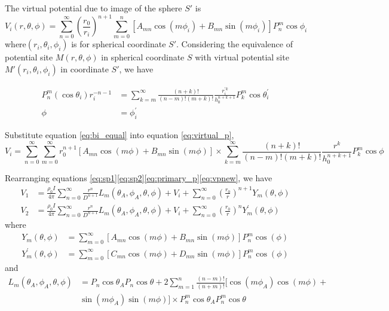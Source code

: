 \documentclass[11pt,letterpaper,leqno]{amsart}
\numberwithin{equation}{section}
\begin{document}
The virtual potential due to image of the sphere $S'$ is
\begin{equation}\label{eq:virtual_p}
V_i(r,\theta,\phi) = \sum\limits_{n=0}^\infty(\frac{r_0}{r_i})^{n+1}\sum\limits_{m=0}^n [A_{mn}\cos(m\phi_i) + B_{mn}\sin(m\phi_i)]P_n^m\cos\phi_i
\end{equation}
where$(r_i,\theta_i,\phi_i)$ is for spherical coordinate $S'$. Considering the equivalence of potential site $M(r,\theta,\phi)$ in spherical coordinate $S$ with virtual potential site $M'(r_i,\theta_i,\phi_i)$ in coordinate $S'$, we have

\begin{subequations}\label{eq:bi_equal}
\begin{align}
P_n^m(\cos\theta_i)r_i^{-n-1} &= \sum\limits_{k=m}^\infty \frac{(n+k)!}{(n-m)!(m+k)!}\frac{r_i^{\prime	k}}{h_0^{n+k+1}}P_k^m\cos\theta_i^\prime \\
\phi &= \phi_i^\prime
\end{align}
\end{subequations}

Substitute equation \eqref{eq:bi_equal} into equation \eqref{eq:virtual_p}, 
\begin{equation}\label{eq:vpnew}
V_i = \sum\limits_{n=0}^\infty\sum\limits_{m=0}^\infty r_0^{n+1}[A_{mn}\cos(m\phi) + B_{mn}\sin(m\phi)] \times \sum\limits_{k=m}^\infty\frac{(n+k)!}{(n-m)!(m+k)!}\frac{r^k}{h_0^{n+k+1}}P_k^m\cos\phi
\end{equation}

Rearranging equations \eqref{eq:sp1}\eqref{eq:sp2}\eqref{eq:primary_p}\eqref{eq:vpnew}, we have
\begin{align}
V_1 &= \frac{\rho_0 I}{4\pi}\sum\limits_{n=0}^\infty\frac{r^n}{D^{n+1}}L_m(\theta_A,\phi_A,\theta,\phi) + V_i + \sum\limits_{n=0}^\infty(\frac{r_0}{r})^{n+1}Y_m(\theta,\phi) \\
V_2 &= \frac{\rho_0 I}{4\pi}\sum\limits_{n=0}^\infty\frac{r^n}{D^{n+1}}L_m(\theta_A,\phi_A,\theta,\phi) + V_i + \sum\limits_{n=0}^\infty(\frac{r_0}{r})^{n}Y^\prime_m(\theta,\phi)
\end{align}
where
\begin{align}
Y_m(\theta,\phi) &= \sum\limits_{m=0}^\infty[A_{mn}\cos(m\phi)+B_{mn}\sin(m\phi)]P_n^m\cos(\phi) \\
Y_m^\prime(\theta,\phi) &= \sum\limits_{m=0}^\infty[C_{mn}\cos(m\phi)+D_{mn}\sin(m\phi)]P_n^m\cos(\phi) 
\end{align}
and
\begin{equation}
\begin{split}
L_m(\theta_A,\phi_A,\theta,\phi) &= P_n\cos\theta_A P_n\cos\theta + 2\sum\limits_{m=1}^n\frac{(n-m)!}{(n+m)!}[\cos(m\phi_A)\cos(m\phi) + \\
&\sin(m\phi_A)\sin(m\phi)] \times P_n^m\cos\theta_A P_n^m\cos\theta
\end{split}
\end{equation}
\end{document}
